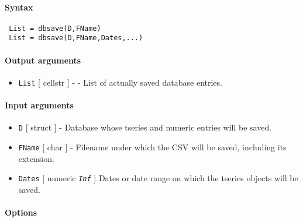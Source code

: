 


	\paragraph{Syntax}
 
 \begin{verbatim}
 List = dbsave(D,FName)
 List = dbsave(D,FName,Dates,...)
 \end{verbatim}
 
 \paragraph{Output arguments}
 
 \begin{itemize}
 \item
   \texttt{List} {[} cellstr {]} - - List of actually saved database
   entries.
 \end{itemize}
 
 \paragraph{Input arguments}
 
 \begin{itemize}
 \item
   \texttt{D} {[} struct {]} - Database whose tseries and numeric entries
   will be saved.
 \item
   \texttt{FName} {[} char {]} - Filename under which the CSV will be
   saved, including its extension.
 \item
   \texttt{Dates} {[} numeric \textbar{} \emph{\texttt{Inf}} {]} Dates or
   date range on which the tseries objects will be saved.
 \end{itemize}
 
 \paragraph{Options}
 
